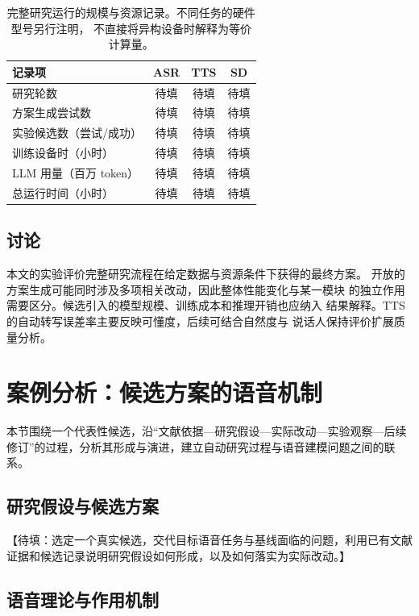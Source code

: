 \documentclass{article}
\newcommand{\pending}[1]{\textcolor{blue!65!black}{【待填：#1】}}
\newcommand{\resultcell}{\textcolor{blue!65!black}{待填}}
\begin{document}
\begin{table}[t]
\centering
\caption{完整研究运行的规模与资源记录。不同任务的硬件型号另行注明，
不直接将异构设备时解释为等价计算量。}
\label{tab:cost}
\setlength{\tabcolsep}{3pt}
\begin{tabularx}{\columnwidth}{Y c c c}
\toprule
记录项 & ASR & TTS & SD \\
\midrule
研究轮数 & \resultcell & \resultcell & \resultcell \\
方案生成尝试数 & \resultcell & \resultcell & \resultcell \\
实验候选数（尝试/成功） & \resultcell & \resultcell & \resultcell \\
训练设备时（小时） & \resultcell & \resultcell & \resultcell \\
LLM 用量（百万 token） & \resultcell & \resultcell & \resultcell \\
总运行时间（小时） & \resultcell & \resultcell & \resultcell \\
\bottomrule
\end{tabularx}
\end{table}

\subsection{讨论}

本文的实验评价完整研究流程在给定数据与资源条件下获得的最终方案。
开放的方案生成可能同时涉及多项相关改动，因此整体性能变化与某一模块
的独立作用需要区分。候选引入的模型规模、训练成本和推理开销也应纳入
结果解释。TTS 的自动转写误差率主要反映可懂度，后续可结合自然度与
说话人保持评价扩展质量分析。

\section{案例分析：候选方案的语音机制}
\label{sec:case}

本节围绕一个代表性候选，沿“文献依据—研究假设—实际改动—实验观察—后续修订”的过程，分析其形成与演进，建立自动研究过程与语音建模问题之间的联系。

\subsection{研究假设与候选方案}

\pending{选定一个真实候选，交代目标语音任务与基线面临的问题，利用已有文献证据和候选记录说明研究假设如何形成，以及如何落实为实际改动。}

\subsection{语音理论与作用机制}
\end{document}
